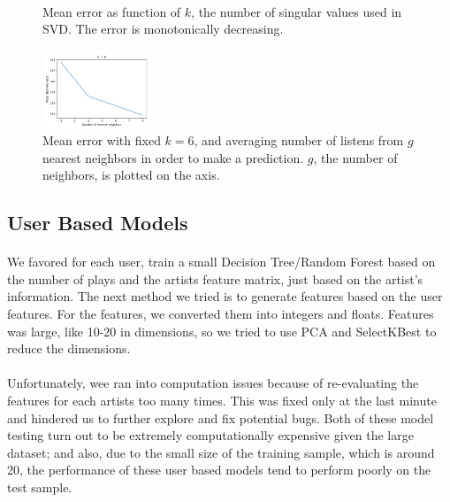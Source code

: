 \documentclass[11pt]{article}
\begin{document}
\begin{figure}[]
\begin{subfigure}[!t]{0.31\textwidth}
    \end{subfigure}\\
        \caption{Mean error as function of $k$, the number of singular values used in SVD. The error is monotonically decreasing.}
            \label{SVD_k}
\end{figure}


\begin{figure}[] 
\centering
        \includegraphics[width=0.31\textwidth]{Plots/SVD_group_8.png}
        \caption{Mean error with fixed $k=6$, and averaging number of listens from $g$ nearest neighbors in order to make a prediction. $g$, the number of neighbors, is plotted on the axis.}
            \label{SVD_g}
\end{figure}


\paragraph{}
\subsection{User Based Models}
\paragraph{}
We favored for each user, train a small Decision Tree/Random Forest based on the number of plays and the artists feature matrix, just based on the artist's information. The next method we tried is to generate features based on the user features. For the features, we converted them into integers and floats. Features was large, like 10-20 in dimensions, so we tried to use PCA and SelectKBest to reduce the dimensions.
 
\paragraph{}
Unfortunately, wee ran into computation issues because of re-evaluating the features for each artists too many times. This was fixed only at the last minute and hindered us to further explore and fix potential bugs. Both of these model testing turn out to be extremely computationally expensive given the large dataset; and also, due to the small size of the training sample, which is around 20, the performance of these user based models tend to perform poorly on the test sample.
\end{document}
